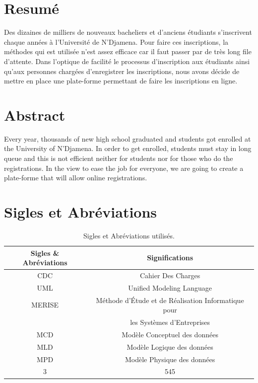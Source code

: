 \documentclass[12pt,a4paper]{article}
\begin{document}
	\newpage
	\section*{Resumé}
	Des dizaines de milliers de nouveaux bacheliers et d'anciens étudiants s’inscrivent chaque années à l’Université de N’Djamena. Pour faire ces inscriptions, la méthodes qui est utilisée n’est assez efficace car il faut passer par de très long file d’attente. Dans l’optique de facilité le processus d’inscription aux étudiants ainsi qu’aux personnes chargées d’enregistrer les inscriptions, nous avons décide de mettre en place une plate-forme permettant de faire les inscriptions en ligne.
	
	\section*{Abstract}
	Every year, thousands of new high school graduated and students got enrolled at the University of N'Djamena. In order to get enrolled, students must stay in long queue and this is not efficient neither for students nor for those who do the registrations. In the view to ease the job for everyone, we are going to create a plate-forme that will allow online registrations.
	
	\newpage
	\section*{Sigles et Abréviations}
	\begin{table}[h!]
		\centering
		\begin{tabular}{||c | c||} 
			\hline
			Sigles \& Abréviations & Significations \\ [0.5ex] 
			\hline \hline
			CDC & Cahier Des Charges \\
			\hline 
			UML & Unified Modeling Language \\
			\hline
			MERISE & Méthode d’Étude et de Réalisation Informatique pour\\ & les Systèmes d’Entreprises \\
			\hline
			MCD & Modèle Conceptuel des données \\
			\hline
			MLD & Modèle Logique des données \\
			\hline
			MPD & Modèle Physique des données \\
			\hline
			3 & 545 \\
			\hline
		\end{tabular}
		\caption{Sigles et Abréviations utilisés.}
		\label{table:sigle_abv}
	\end{table}
\end{document}
